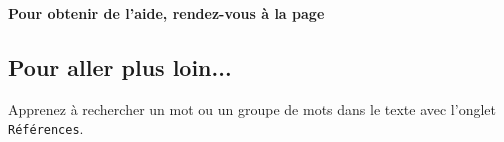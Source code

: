 \begin{center}\label{modelePage5e3}\end{center}

\textbf{Pour obtenir de l'aide, rendez-vous à la page \pageref{aide_seancesWord}}

\subsection{Pour aller plus loin...}

Apprenez à rechercher un mot ou un groupe de mots dans le texte avec l'onglet \texttt{Références}.

\vfill
\phantom{rien}













